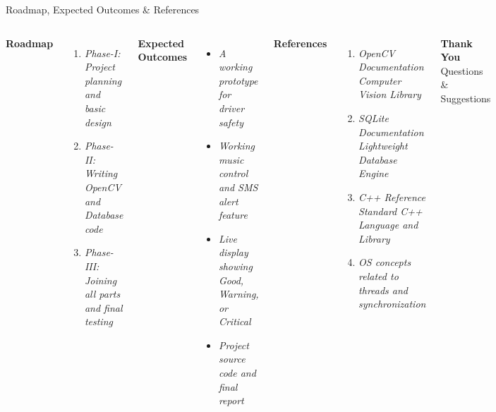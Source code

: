 \documentclass[aspectratio=169,11pt]{beamer}
\newcommand{\placeholder}[1]{\textit{\color{GEUGrey}#1}}
\begin{document}
\begin{frame}{Roadmap, Expected Outcomes \& References}
\vspace{-3mm}
\begin{columns}[T,totalwidth=\textwidth]
\textbf{\color{GEUBlue}Roadmap}
\vspace{-1mm}
\begin{enumerate}\itemsep0pt
\item \placeholder{Phase-I: Project planning and basic design}
\item \placeholder{Phase-II: Writing OpenCV and Database code}
\item \placeholder{Phase-III: Joining all parts and final testing}
\end{enumerate}
\vspace{2mm}
\textbf{\color{GEUBlue}Expected Outcomes}
\vspace{-1mm}
\begin{itemize}\itemsep0pt
\item \placeholder{A working prototype for driver safety}
\item \placeholder{Working music control and SMS alert feature}
\item \placeholder{Live display showing Good, Warning, or Critical}
\item \placeholder{Project source code and final report}
\end{itemize}
\textbf{\color{GEUBlue}References}
\vspace{-1mm}
\begin{enumerate}\itemsep0pt
\item \placeholder{OpenCV Documentation Computer Vision Library}
\item \placeholder{SQLite Documentation Lightweight Database Engine}
\item \placeholder{C++ Reference Standard C++ Language and Library}
\item \placeholder{OS concepts related to threads and synchronization}
\end{enumerate}
\vspace{4mm}
\begin{center}
\colorbox{GEUBlue}{\parbox{.78\textwidth}{\centering\color{white}\textbf{Thank You}\\Questions \& Suggestions}}
\end{center}
\end{columns}
\end{frame}
\end{document}
